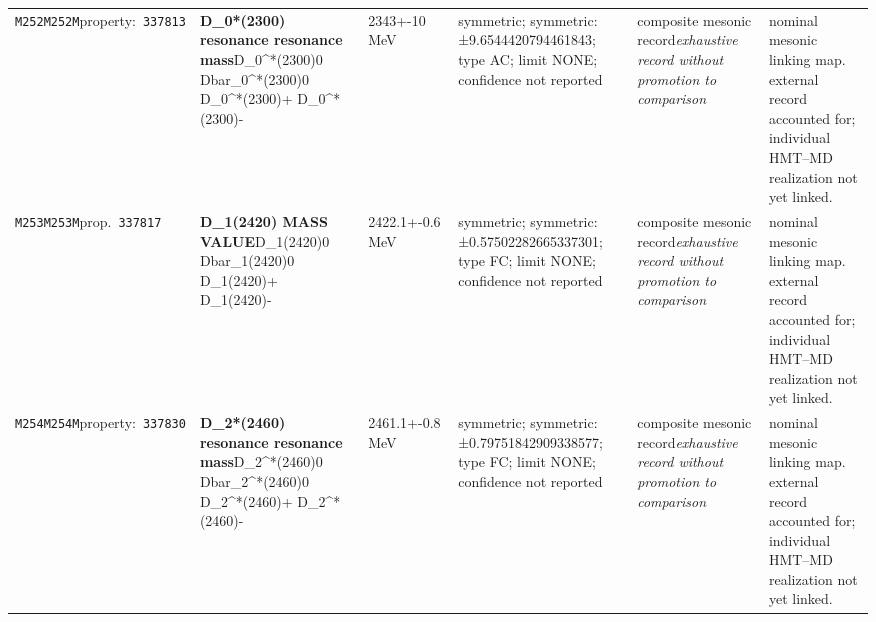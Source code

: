 \begin{landscape}
\begin{longtable}{L{1.85cm}L{4.45cm}L{2.35cm}L{4.05cm}L{3.35cm}L{7.15cm}}
\texttt{M252}\newline \texttt{M252M}\newline property:\ \texttt{337813} & \textbf{D\_\allowbreak{}0*(2300) resonance resonance mass}\newline D\_\allowbreak{}0\textasciicircum{}*(2300)0 \textbar{}\allowbreak{} Dbar\_\allowbreak{}0\textasciicircum{}*(2300)0 \textbar{}\allowbreak{} D\_\allowbreak{}0\textasciicircum{}*(2300)+ \textbar{}\allowbreak{} D\_\allowbreak{}0\textasciicircum{}*(2300)- & 2343+-10\,MeV & symmetric; symmetric: ±9.6544420794461843; type AC; limit NONE; confidence not reported & composite mesonic record\newline \emph{exhaustive record without promotion to comparison} & nominal mesonic linking map. external record accounted for; individual HMT--MD realization not yet linked. \\
\texttt{M253}\newline \texttt{M253M}\newline prop.\ \texttt{337817} & \textbf{D\_\allowbreak{}1(2420) MASS VALUE}\newline D\_\allowbreak{}1(2420)0 \textbar{}\allowbreak{} Dbar\_\allowbreak{}1(2420)0 \textbar{}\allowbreak{} D\_\allowbreak{}1(2420)+ \textbar{}\allowbreak{} D\_\allowbreak{}1(2420)- & 2422.1+-0.6\,MeV & symmetric; symmetric: ±0.57502282665337301; type FC; limit NONE; confidence not reported & composite mesonic record\newline \emph{exhaustive record without promotion to comparison} & nominal mesonic linking map. external record accounted for; individual HMT--MD realization not yet linked. \\
\texttt{M254}\newline \texttt{M254M}\newline property:\ \texttt{337830} & \textbf{D\_\allowbreak{}2*(2460) resonance resonance mass}\newline D\_\allowbreak{}2\textasciicircum{}*(2460)0 \textbar{}\allowbreak{} Dbar\_\allowbreak{}2\textasciicircum{}*(2460)0 \textbar{}\allowbreak{} D\_\allowbreak{}2\textasciicircum{}*(2460)+ \textbar{}\allowbreak{} D\_\allowbreak{}2\textasciicircum{}*(2460)- & 2461.1+-0.8\,MeV & symmetric; symmetric: ±0.79751842909338577; type FC; limit NONE; confidence not reported & composite mesonic record\newline \emph{exhaustive record without promotion to comparison} & nominal mesonic linking map. external record accounted for; individual HMT--MD realization not yet linked. \\

\end{longtable}
\end{landscape}
